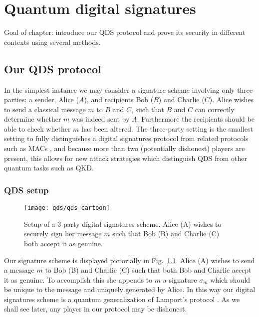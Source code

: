 \chapter{Quantum digital signatures}
Goal of chapter: introduce our QDS protocol and prove its security in different contexts using several methods.


\section{Our QDS protocol}\label{sec:qds_protocol}

In the simplest instance we may consider a signature scheme involving only three parties: a sender, Alice ($A$), and recipients Bob ($B$) and Charlie ($C$). Alice wishes to send a classical message $m$ to $B$ and $C$, such that $B$ and $C$ can correctly determine whether $m$ was indeed sent by $A$. Furthermore the recipients should be able to check whether $m$ has been altered. The three-party setting is the smallest setting to fully distinguishes a digital signatures protocol from related protocols such as MACs \cite{Schneier1996}, and because more than two (potentially dishonest) players are present, this allows for new attack strategies which distinguish QDS from other quantum tasks such as QKD.

\subsection{QDS setup}

\begin{figure}[htp]
\centering
\texttt{[image: qds/qds\_cartoon]}
\caption{\label{fig:qds_cartoon} Setup of a $3$-party digital signatures scheme. Alice (A) wishes to securely sign her message $m$ such that Bob (B) and Charlie (C) both accept it as genuine.}
\end{figure}

Our signature scheme is displayed pictorially in Fig.~\ref{fig:qds_cartoon}. Alice (A) wishes to send a message $m$ to Bob (B) and Charlie (C) such that both Bob and Charlie accept it as genuine. To accomplish this she appends to $m$ a signature $\sigma_m$ which should be unique to the message and uniquely generated by Alice. In this way our digital signatures scheme is a quantum generalization of Lamport's protocol \cite{Schneier1996}. As we shall see later, any player in our protocol may be dishonest.

